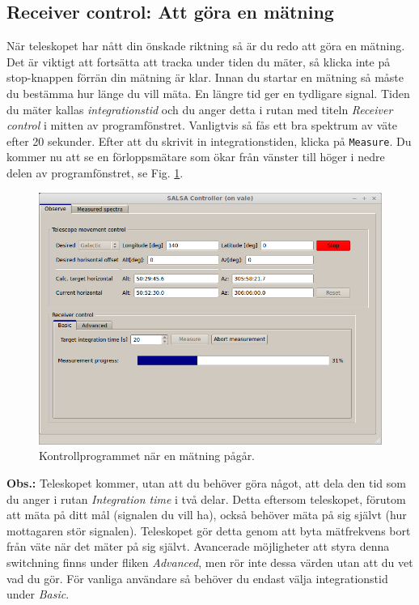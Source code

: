 \subsection{Receiver control: Att göra en mätning}
När teleskopet har nått din önskade riktning så är du redo att göra en mätning. 
Det är viktigt att fortsätta att tracka under tiden du mäter, så klicka inte på 
stop-knappen förrän din mätning är klar. Innan du startar en mätning så
måste du bestämma hur länge du vill mäta. En längre tid ger en tydligare signal. 
Tiden du mäter kallas \emph{integrationstid} och du anger detta i rutan med titeln
\emph{Receiver control} i mitten av programfönstret. Vanligtvis så fås ett bra spektrum
av väte efter 20 sekunder. Efter att du skrivit in integrationstiden, klicka på 
{\tt Measure}. Du kommer nu att se en förloppsmätare som ökar från vänster
till höger i nedre delen av programfönstret, se Fig. \ref{fig:controlmeasure}.
\begin{figure}[ht]
\begin{center}
\includegraphics[width=\textwidth]{../figures/Controller_measure.png}
\end{center}
\caption{Kontrollprogrammet när en mätning pågår.}
\label{fig:controlmeasure}
\end{figure}

{\bf Obs.:} Teleskopet kommer, utan att du behöver göra något, att dela den tid
som du anger i rutan \emph{Integration time} i två delar. Detta eftersom
teleskopet, förutom att mäta på ditt mål (signalen du vill ha), också behöver
mäta på sig självt (hur mottagaren stör signalen). Teleskopet gör detta genom
att byta mätfrekvens bort från väte när det mäter på sig självt. Avancerade
möjligheter att styra denna switchning finns under fliken \emph{Advanced}, men
rör inte dessa värden utan att du vet vad du gör. För vanliga användare så
behöver du endast välja integrationstid under \emph{Basic}. 

